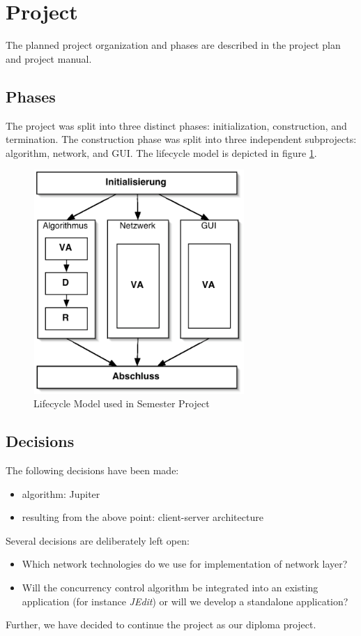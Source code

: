 \documentclass[11pt,a4paper]{article}
\begin{document}
\section{Project}
The planned project organization and phases are described in the project plan and project manual.

\subsection{Phases}
The project was split into three distinct phases: initialization, construction, and termination. The construction phase was split into three independent subprojects: algorithm, network, and GUI. The lifecycle model is depicted in figure \ref{fig:lifecycle}.

\begin{figure}[H]
 \centering
 \includegraphics[width=8cm,height=8.5cm]{../../images/vorgehensmodell.eps}
 \caption{Lifecycle Model used in Semester Project}
 \label{fig:lifecycle}
\end{figure}

\subsection{Decisions}
The following decisions have been made:
\begin{itemize}
 \item algorithm: Jupiter
 \item resulting from the above point: client-server architecture
\end{itemize}
Several decisions are deliberately left open:
\begin{itemize}
 \item Which network technologies do we use for implementation of network layer?
 \item Will the concurrency control algorithm be integrated into an existing application (for instance \emph{JEdit}) or will we develop a standalone application?
\end{itemize}
Further, we have decided to continue the project as our diploma project.
\end{document}

